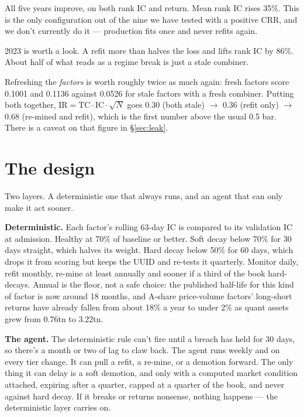 \documentclass[11pt]{article}
\begin{document}
All five years improve, on both rank IC and return. Mean rank IC rises 35\%. This
is the only configuration out of the nine we have tested with a positive CRR, and
we don't currently do it --- production fits once and never refits again.

2023 is worth a look. A refit more than halves the loss and lifts rank IC by 86\%.
About half of what reads as a regime break is just a stale combiner.

Refreshing the \emph{factors} is worth roughly twice as much again: fresh factors
score 0.1001 and 0.1136 against 0.0526 for stale factors with a fresh combiner.
Putting both together, $\mathrm{IR}=\mathrm{TC}\cdot\mathrm{IC}\cdot\sqrt{N}$ goes
0.30 (both stale) $\to$ 0.36 (refit only) $\to$ 0.68 (re-mined and refit), which is
the first number above the usual 0.5 bar. There is a caveat on that figure in
\S\ref{sec:leak}.

\section{The design}

Two layers. A deterministic one that always runs, and an agent that can only make
it act sooner.

\textbf{Deterministic.} Each factor's rolling 63-day IC is compared to its
validation IC at admission. Healthy at 70\% of baseline or better. Soft decay below
70\% for 30 days straight, which halves its weight. Hard decay below 50\% for 60
days, which drops it from scoring but keeps the UUID and re-tests it quarterly.
Monitor daily, refit monthly, re-mine at least annually and sooner if a third of
the book hard-decays. Annual is the floor, not a safe choice: the published
half-life for this kind of factor is now around 18 months, and A-share price-volume
factors' long-short returns have already fallen from about 18\% a year to under 2\% as
quant assets grew from \textyen 0.76tn to \textyen 3.22tn.

\textbf{The agent.} The deterministic rule can't fire until a breach has held for
30 days, so there's a month or two of lag to claw back. The agent runs weekly and
on every tier change. It can pull a refit, a re-mine, or a demotion forward. The
only thing it can delay is a soft demotion, and only with a computed market
condition attached, expiring after a quarter, capped at a quarter of the book, and
never against hard decay. If it breaks or returns nonsense, nothing happens --- the
deterministic layer carries on.
\end{document}
